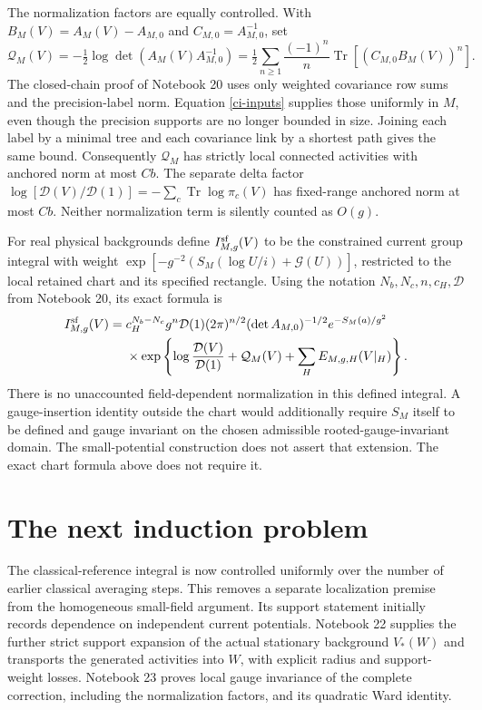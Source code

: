 \documentclass[11pt]{article}
\theoremstyle{remark}
\begin{document}
The normalization factors are equally controlled. With
$B_M(V)=A_M(V)-A_{M,0}$ and $C_{M,0}=A_{M,0}^{-1}$, set
\begin{equation}\label{ci-det}
 \mathcal Q_M(V)=-\tfrac12\log\det(A_M(V)A_{M,0}^{-1})
   =\tfrac12\sum_{n\ge1}\frac{(-1)^n}{n}
                         \operatorname{Tr}[(C_{M,0}B_M(V))^n].
\end{equation}
The closed-chain proof of Notebook 20 uses only weighted
covariance row sums and the precision-label norm.
Equation \eqref{ci-inputs} supplies those uniformly in $M$,
even though the precision supports are no longer bounded
in size. Joining each label by a minimal tree and each
covariance link by a shortest path gives the same bound.
Consequently $\mathcal Q_M$ has strictly local connected
activities with anchored norm at most $Cb$. The separate
delta factor
$\log[\mathcal D(V)/\mathcal D(1)]=-\sum_c\operatorname{Tr}
\log\pi_c(V)$ has fixed-range anchored norm at most $Cb$.
Neither normalization term is silently counted as $O(g)$.

For real physical backgrounds define $I^{\rm sf}_{M,g}(V)$
to be the constrained current group integral with weight
$\exp[-g^{-2}(S_M(\log U/i)+\mathcal G(U))]$, restricted
to the local retained chart and its specified rectangle.
Using the notation $N_b,N_c,n,c_H,\mathcal D$ from
Notebook 20, its exact formula is
\begin{equation}\label{ci-exact}
 \begin{split}
 I^{\rm sf}_{M,g}(V)={}&
 c_H^{N_b-N_c}g^n\mathcal D(1)
       (2\pi)^{n/2}(\det A_{M,0})^{-1/2}
                       e^{-S_M(a)/g^2}\\
 &\times\exp\left\{
 \log\frac{\mathcal D(V)}{\mathcal D(1)}
       +\mathcal Q_M(V)+\sum_HE_{M,g,H}(V|_H)\right\}.
 \end{split}
\end{equation}
There is no unaccounted field-dependent normalization in
this defined integral. A gauge-insertion identity outside
the chart would additionally require $S_M$ itself to be
defined and gauge invariant on the chosen admissible
rooted-gauge-invariant domain. The small-potential construction
does not assert that extension. The exact chart formula above
does not require it.

\section{The next induction problem}
\label{ci-next}

The classical-reference integral is now controlled uniformly
over the number of earlier classical averaging steps.
This removes a separate localization premise from the
homogeneous small-field argument. Its support statement
initially records dependence on independent current potentials.
Notebook 22 supplies the further strict support expansion of
the actual stationary background $V_*(W)$ and transports the
generated activities into $W$, with explicit radius and
support-weight losses. Notebook 23 proves local gauge
invariance of the complete correction, including the
normalization factors, and its quadratic Ward identity.
\end{document}

